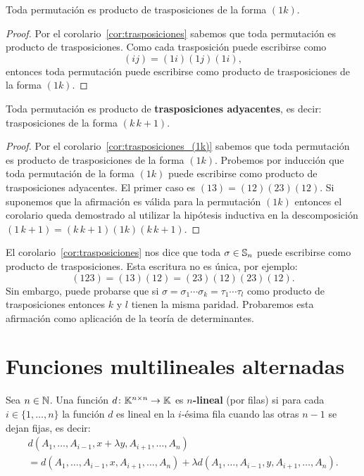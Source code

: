 \begin{cor}
	\label{cor:trasposiciones_(1k)}
    Toda permutación es producto de trasposiciones de la forma $(1k)$.

    \begin{proof}
		Por el corolario~\ref{cor:trasposiciones} sabemos que toda permutación
		es producto de trasposiciones. Como cada trasposición puede escribirse
		como
        \[
            (ij)=(1i)(1j)(1i),
        \]
        entonces toda permutación puede escribirse como producto de
        trasposiciones de la forma $(1k)$. 
	\end{proof}
\end{cor}


\begin{cor}
    \label{cor:trasposiciones_ady}
	Toda permutación es producto de \textbf{trasposiciones adyacentes}, es
	decir: trasposiciones de la forma $(k\,k+1)$. 

    \begin{proof}
		Por el corolario~\ref{cor:trasposiciones_(1k)} sabemos que toda
		permutación es producto de trasposiciones de la forma $(1k)$.  Probemos
		por inducción que toda permutación de la forma $(1k)$ puede escribirse
		como producto de trasposiciones adyacentes. El primer caso es
		$(13)=(12)(23)(12)$. Si suponemos que la afirmación es válida para la
		permutación $(1k)$ entonces el corolario queda demostrado al utilizar
		la hipótesis inductiva en la descomposición
		$(1\,k+1)=(k\,k+1)(1k)(k\,k+1)$.
    \end{proof}
\end{cor}

\begin{block}
    El corolario~\ref{cor:trasposiciones} nos dice que toda $\sigma\in\mathbb{S}_n$
    puede escribirse como producto de trasposiciones.  Esta escritura no es
    única, por ejemplo:
    \[
        (123)=(13)(12)=(23)(12)(23)(12).
    \]
	Sin embargo, puede probarse que si
	$\sigma=\sigma_1\cdots\sigma_k=\tau_1\cdots\tau_l$ como producto de
	trasposiciones entonces $k$ y $l$ tienen la misma paridad. Probaremos esta
	afirmación como aplicación de la teoría de determinantes.
\end{block}

\section{Funciones multilineales alternadas}

\begin{block}
    Sea $n\in\mathbb{N}$. Una función $d\colon\mathbb{K}^{n\times n}\to\mathbb{K}$ es
    \textbf{$n$-lineal} (por filas) si para cada $i\in\{1,\dots,n\}$ la función
    $d$ es lineal en la $i$-ésima fila cuando las otras $n-1$ se dejan fijas,
    es decir: 
	\begin{multline*}
		d(A_1,\dots,A_{i-1},x+\lambda y,A_{i+1},\dots,A_n)
		\\=d(A_1,\dots,A_{i-1},x,A_{i+1},\dots,A_n)+
		\lambda d(A_1,\dots,A_{i-1},y,A_{i+1},\dots,A_n).
	\end{multline*}
\end{block}


